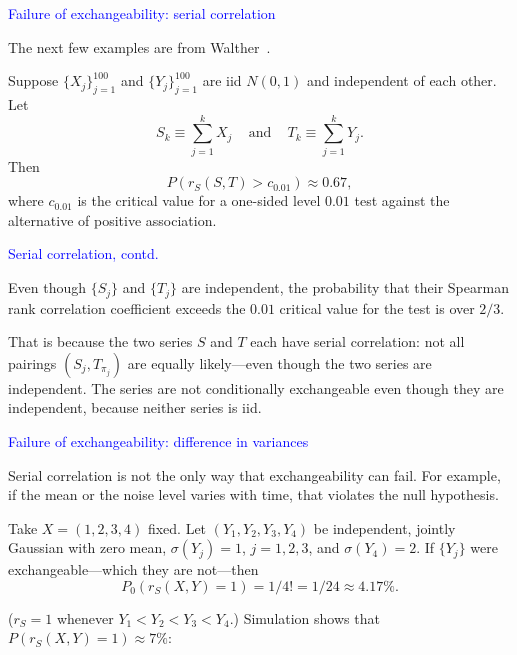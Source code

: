 \documentclass[landscape]{slides}
\newcommand{\beq}{\begin{equation}}
\newcommand{\eeq}{\end{equation}}
\begin{document}
\begin{slide}
{\textcolor{blue}{Failure of exchangeability: serial correlation}}

The next few examples are  from Walther~\cite{walther97,walther99}.

Suppose $\{X_j\}_{j=1}^{100}$ and 
$\{Y_j\}_{j=1}^{100}$ are iid $N(0,1)$
and independent of each other.
Let
\beq     
      S_k \equiv \sum_{j=1}^k X_j \;\;\; \mbox{ and } \;\;\;
     T_k \equiv \sum_{j=1}^k Y_j.
\eeq
Then
\beq   
     P(r_S(S, T) > c_{0.01}) \approx 0.67,
\eeq
  where $c_{0.01}$ is the critical value for a one-sided
    level $0.01$ test against the alternative of positive association.

\begin{slide}
{\textcolor{blue}{Serial correlation, contd.}}

    Even though $\{S_j\}$ and $\{T_j\}$ are independent,
    the probability that their Spearman rank correlation coefficient exceeds
    the $0.01$ critical value for the test is over $2/3$.
    
    That is because the two series $S$ and $T$ each have
    serial correlation: not all pairings $(S_j, T_{\pi_j})$
    are equally likely---even though the two series are independent.
    The series are not conditionally exchangeable even though they are
    independent, because neither series is iid.

\end{slide}

\begin{slide}
{\textcolor{blue}{Failure of exchangeability: difference in variances}}

   Serial correlation is not the only way that exchangeability can fail.
    For example, if the mean or the noise level varies with time, that violates
    the null hypothesis.
    
    Take $X = (1, 2, 3, 4)$ fixed.
    Let $(Y_1, Y_2, Y_3, Y_4)$
    be independent, jointly Gaussian with zero mean, $\sigma(Y_j) = 1$,
   $j = 1, 2, 3$, and $\sigma(Y_4) = 2$.
    If $\{Y_j\}$ were exchangeable---which they are not---then
\beq
    P_0(r_S (X, Y) = 1) = 1/4! = 1/24 \approx 4.17\%.
\eeq

   ($r_S = 1$ whenever
   $Y_1 < Y_2 < Y_3 < Y_4$.)
   Simulation shows that  $P(r_S(X, Y)=1)\approx 7\%$:


\end{slide}
\end{slide}
\end{document}
